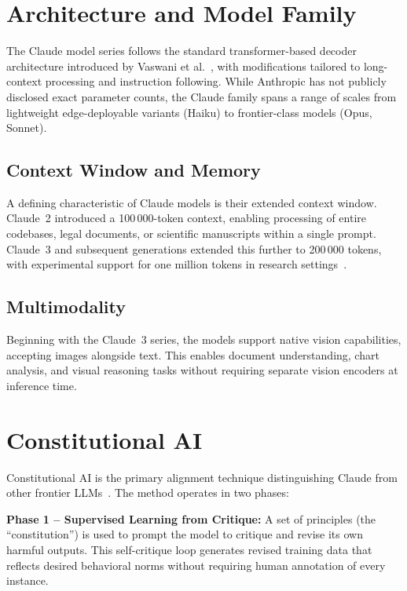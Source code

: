 \documentclass[10pt,twocolumn]{article}
\begin{document}
\section{Architecture and Model Family}
\label{sec:architecture}

The Claude model series follows the standard transformer-based decoder architecture introduced by Vaswani et al.~\cite{vaswani2017}, with modifications tailored to long-context processing and instruction following. While Anthropic has not publicly disclosed exact parameter counts, the Claude family spans a range of scales from lightweight edge-deployable variants (Haiku) to frontier-class models (Opus, Sonnet).

\subsection{Context Window and Memory}

A defining characteristic of Claude models is their extended context window. Claude~2 introduced a 100\,000-token context, enabling processing of entire codebases, legal documents, or scientific manuscripts within a single prompt. Claude~3 and subsequent generations extended this further to 200\,000 tokens, with experimental support for one million tokens in research settings~\cite{anthropic2024claude3}.

\subsection{Multimodality}

Beginning with the Claude~3 series, the models support native vision capabilities, accepting images alongside text. This enables document understanding, chart analysis, and visual reasoning tasks without requiring separate vision encoders at inference time.

\section{Constitutional AI}
\label{sec:cai}

Constitutional AI is the primary alignment technique distinguishing Claude from other frontier LLMs~\cite{bai2022constitutional}. The method operates in two phases:

\textbf{Phase 1 -- Supervised Learning from Critique:} A set of principles (the ``constitution'') is used to prompt the model to critique and revise its own harmful outputs. This self-critique loop generates revised training data that reflects desired behavioral norms without requiring human annotation of every instance.
\end{document}
